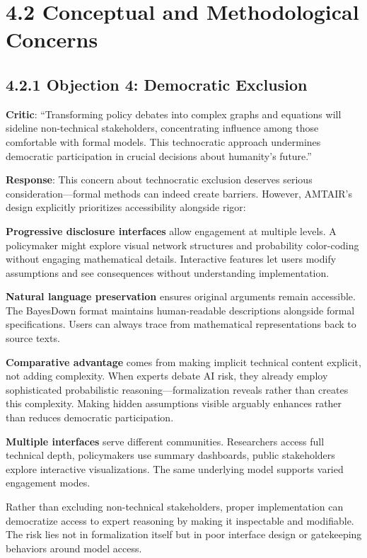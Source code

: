 \documentclass[
  11pt,
  letterpaper,
]{book}
\begin{document}
\section{4.2 Conceptual and Methodological
Concerns}\label{sec-conceptual-concerns}

\subsection{4.2.1 Objection 4: Democratic
Exclusion}\label{sec-democratic-exclusion}

\textbf{Critic}: ``Transforming policy debates into complex graphs and
equations will sideline non-technical stakeholders, concentrating
influence among those comfortable with formal models. This technocratic
approach undermines democratic participation in crucial decisions about
humanity's future.''

\textbf{Response}: This concern about technocratic exclusion deserves
serious consideration---formal methods can indeed create barriers.
However, AMTAIR's design explicitly prioritizes accessibility alongside
rigor:

\textbf{Progressive disclosure interfaces} allow engagement at multiple
levels. A policymaker might explore visual network structures and
probability color-coding without engaging mathematical details.
Interactive features let users modify assumptions and see consequences
without understanding implementation.

\textbf{Natural language preservation} ensures original arguments remain
accessible. The BayesDown format maintains human-readable descriptions
alongside formal specifications. Users can always trace from
mathematical representations back to source texts.

\textbf{Comparative advantage} comes from making implicit technical
content explicit, not adding complexity. When experts debate AI risk,
they already employ sophisticated probabilistic
reasoning---formalization reveals rather than creates this complexity.
Making hidden assumptions visible arguably enhances rather than reduces
democratic participation.

\textbf{Multiple interfaces} serve different communities. Researchers
access full technical depth, policymakers use summary dashboards, public
stakeholders explore interactive visualizations. The same underlying
model supports varied engagement modes.

Rather than excluding non-technical stakeholders, proper implementation
can democratize access to expert reasoning by making it inspectable and
modifiable. The risk lies not in formalization itself but in poor
interface design or gatekeeping behaviors around model access.
\end{document}
